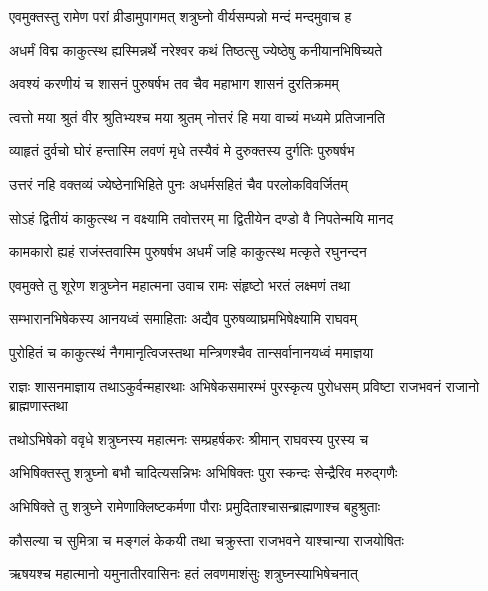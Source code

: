 
\twolineshloka
{एवमुक्तस्तु रामेण परां व्रीडामुपागमत्}
{शत्रुघ्नो वीर्यसम्पन्नो मन्दं मन्दमुवाच ह} %

\twolineshloka
{अधर्मं विद्म काकुत्स्थ ह्यस्मिन्नर्थे नरेश्वर}
{कथं तिष्ठत्सु ज्येष्ठेषु कनीयानभिषिच्यते} %

\twolineshloka
{अवश्यं करणीयं च शासनं पुरुषर्षभ}
{तव चैव महाभाग शासनं दुरतिक्रमम्} %

\twolineshloka
{त्वत्तो मया श्रुतं वीर श्रुतिभ्यश्च मया श्रुतम्}
{नोत्तरं हि मया वाच्यं मध्यमे प्रतिजानति} %

\twolineshloka
{व्याहृतं दुर्वचो घोरं हन्तास्मि लवणं मृधे}
{तस्यैवं मे दुरुक्तस्य दुर्गतिः पुरुषर्षभ} %

\twolineshloka
{उत्तरं नहि वक्तव्यं ज्येष्ठेनाभिहिते पुनः}
{अधर्मसहितं चैव परलोकविवर्जितम्} %

\twolineshloka
{सोऽहं द्वितीयं काकुत्स्थ न वक्ष्यामि तवोत्तरम्}
{मा द्वितीयेन दण्डो वै निपतेन्मयि मानद} %

\twolineshloka
{कामकारो ह्यहं राजंस्तवास्मि पुरुषर्षभ}
{अधर्मं जहि काकुत्स्थ मत्कृते रघुनन्दन} %

\twolineshloka
{एवमुक्ते तु शूरेण शत्रुघ्नेन महात्मना}
{उवाच रामः संहृष्टो भरतं लक्ष्मणं तथा} %

\twolineshloka
{सम्भारानभिषेकस्य आनयध्वं समाहिताः}
{अद्यैव पुरुषव्याघ्रमभिषेक्ष्यामि राघवम्} %

\twolineshloka
{पुरोहितं च काकुत्स्थं नैगमानृत्विजस्तथा}
{मन्त्रिणश्चैव तान्सर्वानानयध्वं ममाज्ञया} %

\threelineshloka
{राज्ञः शासनमाज्ञाय तथाऽकुर्वन्महारथाः}
{अभिषेकसमारम्भं पुरस्कृत्य पुरोधसम्}
{प्रविष्टा राजभवनं राजानो ब्राह्मणास्तथा} %

\twolineshloka
{तथोऽभिषेको ववृधे शत्रुघ्नस्य महात्मनः}
{सम्प्रहर्षकरः श्रीमान् राघवस्य पुरस्य च} %

\twolineshloka
{अभिषिक्तस्तु शत्रुघ्नो बभौ चादित्यसन्निभः}
{अभिषिक्तः पुरा स्कन्दः सेन्द्रैरिव मरुद्गणैः} %

\twolineshloka
{अभिषिक्ते तु शत्रुघ्ने रामेणाक्लिष्टकर्मणा}
{पौराः प्रमुदिताश्चासन्ब्राह्मणाश्च बहुश्रुताः} %

\twolineshloka
{कौसल्या च सुमित्रा च मङ्गलं केकयी तथा}
{चक्रुस्ता राजभवने याश्चान्या राजयोषितः} %

\twolineshloka
{ऋषयश्च महात्मानो यमुनातीरवासिनः}
{हतं लवणमाशंसुः शत्रुघ्नस्याभिषेचनात्} %

